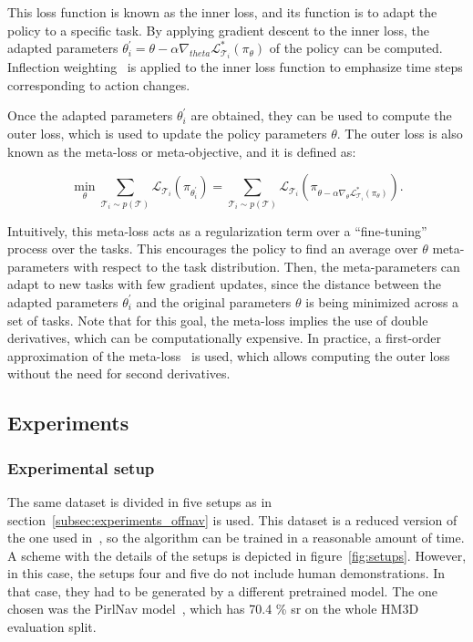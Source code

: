 This loss function is known as the inner loss, and its function is to adapt the policy to a specific task.
By applying gradient descent to the inner loss, the adapted parameters $\theta^\prime_i = \theta-\alpha\nabla_{theta}\mathcal{L}^*_{\mathcal{T}_i}(\pi_\theta)$ of the policy can be computed.
Inflection weighting~\cite{wijmans2019b} is applied to the inner loss function to emphasize time steps corresponding to action changes.

Once the adapted parameters $\theta^\prime_i$ are obtained, they can be used to compute the outer loss, which is used to update the policy parameters $\theta$.
The outer loss is also known as the meta-loss or meta-objective, and it is defined as:

\begin{equation}
    \min _{\theta} \sum_{\mathcal{T}_i \sim p(\mathcal{T})} \mathcal{L}_{\mathcal{T}_i}\left(\pi_{\theta_i^{\prime}}\right)=\sum_{\mathcal{T}_i \sim p(\mathcal{T})} \mathcal{L}_{\mathcal{T}_i}\left(\pi_{\theta-\alpha \nabla_\theta \mathcal{L}_{\mathcal{T}_i}^*\left(\pi_\theta\right)}\right).
    \label{eq:meta_loss_metanav}
\end{equation}

Intuitively, this meta-loss acts as a regularization term over a ``fine-tuning'' process over the tasks.
This encourages the policy to find an average over $\theta$ meta-parameters with respect to the task distribution.
Then, the meta-parameters can adapt to new tasks with few gradient updates, since the distance between the adapted parameters $\theta^\prime_i$ and the original parameters $\theta$ is being minimized across a set of tasks.
Note that for this goal, the meta-loss implies the use of double derivatives, which can be computationally expensive.
In practice, a first-order approximation of the meta-loss~\cite{finn2017} is used, which allows computing the outer loss without the need for second derivatives.

\subsection{Experiments}\label{subsec:experiments_metanav}

\subsubsection{Experimental setup}\label{subsubsec:experimental-setup}

The same dataset is divided in five setups as in section~\ref{subsec:experiments_offnav} is used.
This dataset is a reduced version of the one used in~\cite{ramrakhya2023}, so the algorithm can be trained in a reasonable amount of time.
A scheme with the details of the setups is depicted in figure~\ref{fig:setups}.
However, in this case, the setups four and five do not include human demonstrations.
In that case, they had to be generated by a different pretrained model.
The one chosen was the PirlNav model~\cite{ramrakhya2023}, which has 70.4 \% \acrshort{sr} on the whole HM3D evaluation split.

